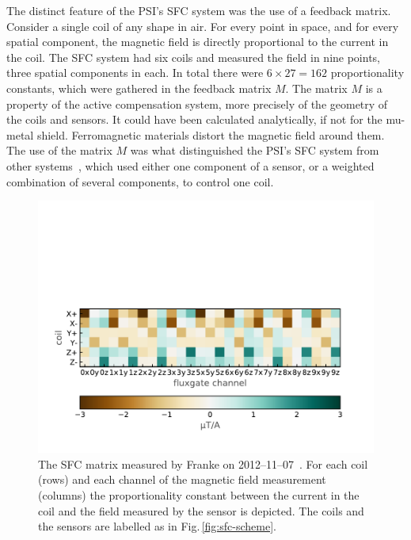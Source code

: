 
The distinct feature of the PSI's SFC system was the use of a feedback matrix.
Consider a single coil of any shape in air. For every point in space, and for every spatial component, the magnetic field is directly proportional to the current in the coil. The SFC system had six coils and measured the field in nine points, three spatial components in each. In total there were $6 \times 27 = 162$ proportionality constants, which were gathered in the feedback matrix $M$. The matrix $M$ is a property of the active compensation system, more precisely of the geometry of the coils and sensors. It could have been calculated analytically, if not for the mu-metal shield. Ferromagnetic materials distort the magnetic field around them. The use of the matrix $M$ was what distinguished the PSI's SFC system from other systems~\cite{Kelha1982,Brake1991,Spemann2003,Brys2005,Kobayashi2012,Voigt2013}, which used either one component of a sensor, or a weighted combination of several components, to control one coil.



\begin{figure}
  \centering
  \includegraphics[width=.8\linewidth]{gfx/nEDM_SFC/nEDM_SFC_matrix.pdf}
  \caption{The SFC matrix measured by Franke on 2012--11--07~\cite{Franke2013}. For each coil (rows) and each channel of the magnetic field measurement (columns) the proportionality constant between the current in the coil and the field measured by the sensor is depicted. The coils and the sensors are labelled as in Fig.\,\ref{fig:sfc-scheme}.}\label{fig:nEDM_SFC_matrix}
\end{figure}

